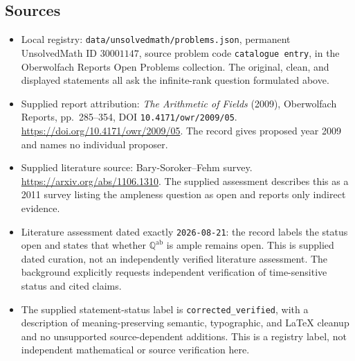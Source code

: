 \documentclass[11pt]{article}
\newcommand{\Q}{\mathbb{Q}}
\begin{document}
\subsection{Sources}
\begin{itemize}
\item Local registry: \texttt{data/unsolvedmath/problems.json}, permanent UnsolvedMath ID $30001147$, source problem code \texttt{catalogue entry}, in the Oberwolfach Reports Open Problems collection. The original, clean, and displayed statements all ask the infinite-rank question formulated above.
\item Supplied report attribution: \emph{The Arithmetic of Fields} (2009), Oberwolfach Reports, pp.~285--354, DOI \texttt{10.4171/owr/2009/05}. \url{https://doi.org/10.4171/owr/2009/05}. The record gives proposed year 2009 and names no individual proposer.
\item Supplied literature source: Bary-Soroker--Fehm survey. \url{https://arxiv.org/abs/1106.1310}. The supplied assessment describes this as a 2011 survey listing the ampleness question as open and reports only indirect evidence.
\item Literature assessment dated exactly \texttt{2026-08-21}: the record labels the status open and states that whether $\Q^{\mathrm{ab}}$ is ample remains open. This is supplied dated curation, not an independently verified literature assessment. The background explicitly requests independent verification of time-sensitive status and cited claims.
\item The supplied statement-status label is \texttt{corrected\_verified}, with a description of meaning-preserving semantic, typographic, and LaTeX cleanup and no unsupported source-dependent additions. This is a registry label, not independent mathematical or source verification here.
\end{itemize}
\end{document}

